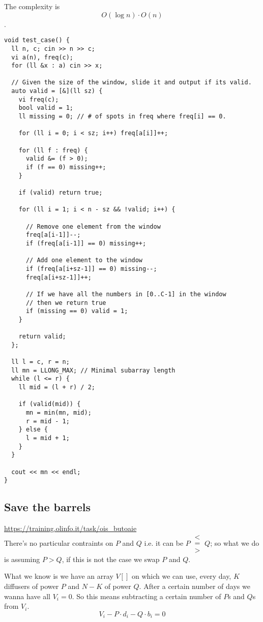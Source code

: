 The complexity is
$$ O(\log n) \cdot O(n)$$.
\begin{verbatim}
void test_case() {
  ll n, c; cin >> n >> c;
  vi a(n), freq(c);
  for (ll &x : a) cin >> x;

  // Given the size of the window, slide it and output if its valid.
  auto valid = [&](ll sz) {
    vi freq(c);
    bool valid = 1;
    ll missing = 0; // # of spots in freq where freq[i] == 0.

    for (ll i = 0; i < sz; i++) freq[a[i]]++;
 
    for (ll f : freq) {
      valid &= (f > 0);
      if (f == 0) missing++;
    }
    
    if (valid) return true;

    for (ll i = 1; i < n - sz && !valid; i++) {
      
      // Remove one element from the window
      freq[a[i-1]]--;
      if (freq[a[i-1]] == 0) missing++;
      
      // Add one element to the window
      if (freq[a[i+sz-1]] == 0) missing--;
      freq[a[i+sz-1]]++;
      
      // If we have all the numbers in [0..C-1] in the window 
      // then we return true
      if (missing == 0) valid = 1;
    }

    return valid;
  };

  ll l = c, r = n;
  ll mn = LLONG_MAX; // Minimal subarray length
  while (l <= r) {
    ll mid = (l + r) / 2;

    if (valid(mid)) {
      mn = min(mn, mid);
      r = mid - 1;
    } else {
      l = mid + 1;
    }
  }

  cout << mn << endl;
}
\end{verbatim}

\subsection{Save the barrels}
\url{https://training.olinfo.it/task/ois_butoaie}\\ 

There's no particular contraints on $P$ and $Q$ i.e. it can be $P\ \substack{< \\ = \\ >}\  Q$; so what we do is assuming $P > Q$, if this is not the case we swap $P$ and $Q$.

What we know is we have an array $V[]$ on which we can use, every day, $K$ diffusers of power $P$ and $N - K$ of power $Q$. After a certain number of days we wanna have all $V_i = 0$. So this means subtracting a certain number of $P$s and $Q$s from $V_i$.
$$V_i - P \cdot d_i - Q \cdot b_i = 0$$

